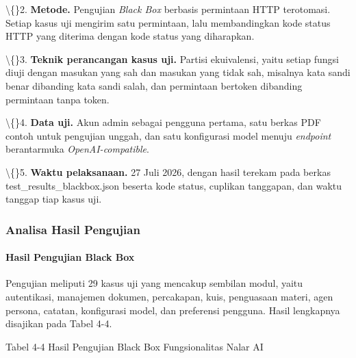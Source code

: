 \documentclass[12pt,a4paper]{article}
\begin{document}
\textbackslash\{\}2. \textbf{Metode.} Pengujian \textit{Black Box} berbasis permintaan HTTP terotomasi. Setiap kasus uji mengirim satu permintaan, lalu membandingkan kode status HTTP yang diterima dengan kode status yang diharapkan.



\textbackslash\{\}3. \textbf{Teknik perancangan kasus uji.} Partisi ekuivalensi, yaitu setiap fungsi diuji dengan masukan yang sah dan masukan yang tidak sah, misalnya kata sandi benar dibanding kata sandi salah, dan permintaan bertoken dibanding permintaan tanpa token.



\textbackslash\{\}4. \textbf{Data uji.} Akun admin sebagai pengguna pertama, satu berkas PDF contoh untuk pengujian unggah, dan satu konfigurasi model menuju \textit{endpoint} berantarmuka \textit{OpenAI-compatible}.



\textbackslash\{\}5. \textbf{Waktu pelaksanaan.} 27 Juli 2026, dengan hasil terekam pada berkas test\_results\_blackbox.json beserta kode status, cuplikan tanggapan, dan waktu tanggap tiap kasus uji.



\subsubsection*{Analisa Hasil Pengujian}

\paragraph*{Hasil Pengujian Black Box}

Pengujian meliputi 29 kasus uji yang mencakup sembilan modul, yaitu autentikasi, manajemen dokumen, percakapan, kuis, penguasaan materi, agen persona, catatan, konfigurasi model, dan preferensi pengguna. Hasil lengkapnya disajikan pada Tabel 4-4.



Tabel 4-4	Hasil Pengujian Black Box Fungsionalitas Nalar AI
\end{document}
